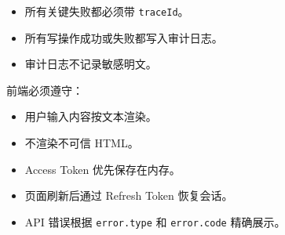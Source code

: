 \documentclass[
  a4paper,
  UTF8]{ctexart}
\providecommand{\tightlist}{%
  \setlength{\itemsep}{0pt}\setlength{\parskip}{0pt}}
\begin{document}
\begin{itemize}
\tightlist
\item
  所有关键失败都必须带 \texttt{traceId}。
\item
  所有写操作成功或失败都写入审计日志。
\item
  审计日志不记录敏感明文。
\end{itemize}

前端必须遵守：

\begin{itemize}
\tightlist
\item
  用户输入内容按文本渲染。
\item
  不渲染不可信 HTML。
\item
  Access Token 优先保存在内存。
\item
  页面刷新后通过 Refresh Token 恢复会话。
\item
  API 错误根据 \texttt{error.type} 和 \texttt{error.code} 精确展示。
\end{itemize}
\end{document}
